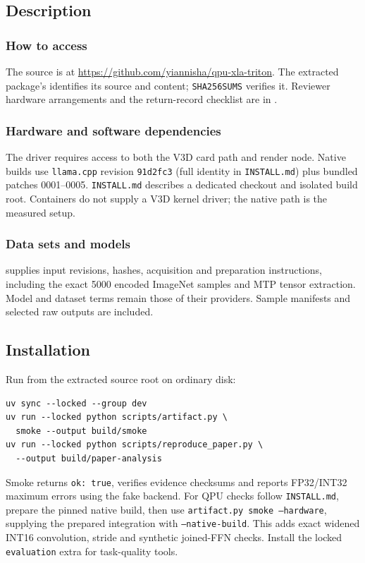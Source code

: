 \subsection{Description}
\subsubsection{How to access}
The source is at \url{https://github.com/yiannisha/qpu-xla-triton}.
The extracted package's  identifies its source
and content; \texttt{SHA256SUMS} verifies it. Reviewer hardware arrangements
and the return-record checklist are in .
\subsubsection{Hardware and software dependencies}
The driver requires access to both the V3D card path and render node.
Native builds use \texttt{llama.cpp} revision
\texttt{91d2fc3} (full identity in \texttt{INSTALL.md}) plus bundled patches
0001--0005. \texttt{INSTALL.md} describes a dedicated checkout and isolated
build root. Containers do not supply a V3D kernel driver; the native path is
the measured setup.
\subsubsection{Data sets and models}
 supplies input revisions, hashes, acquisition and
preparation instructions, including the exact 5000 encoded ImageNet samples
and MTP tensor extraction. Model and dataset terms remain those of their
providers. Sample manifests and selected raw outputs are included.

\subsection{Installation}
Run from the extracted source root on ordinary disk:
\begin{small}\begin{verbatim}
uv sync --locked --group dev
uv run --locked python scripts/artifact.py \
  smoke --output build/smoke
uv run --locked python scripts/reproduce_paper.py \
  --output build/paper-analysis
\end{verbatim}\end{small}
Smoke returns \texttt{ok: true}, verifies evidence checksums and reports
FP32/INT32 maximum errors using the fake backend. For QPU checks follow
\texttt{INSTALL.md}, prepare the pinned native build, then use
\texttt{artifact.py smoke --hardware}, supplying the prepared integration
with \texttt{--native-build}.
This adds exact widened INT16 convolution, stride and synthetic joined-FFN
checks. Install the locked \texttt{evaluation} extra for task-quality tools.

